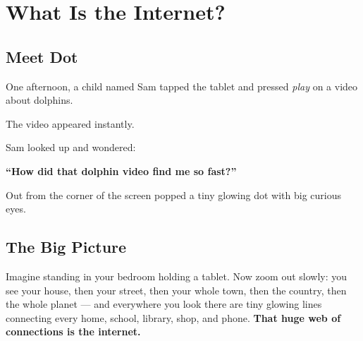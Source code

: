 
\chapter{What Is the Internet?}


\section*{Meet Dot}

One afternoon, a child named Sam tapped the tablet and pressed \emph{play} on a video
about dolphins.

The video appeared instantly.

Sam looked up and wondered:

\begin{center}
  \Large\bfseries\color{InternetBlue}
  ``How did that dolphin video find me so fast?''
\end{center}

\vspace{8pt}

Out from the corner of the screen popped a tiny glowing dot with big curious eyes.


\vspace{6pt}

\section*{The Big Picture}

\begin{picturethis}
  Imagine standing in your bedroom holding a tablet.
  Now zoom out slowly: you see your house, then your street,
  then your whole town, then the country, then the whole planet —
  and everywhere you look there are tiny glowing lines connecting
  every home, school, library, shop, and phone.
  \textbf{That huge web of connections is the internet.}
\end{picturethis}

